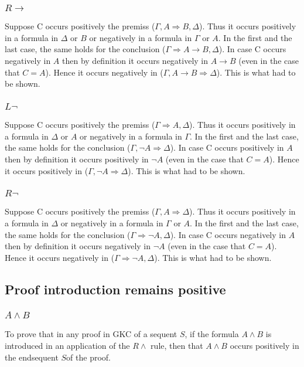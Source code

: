 \documentclass{article}
\begin{document}
\subsubsection{$R\to$}
Suppose C occurs positively the premiss
($\Gamma, A \Rightarrow B, \Delta$). Thus it occurs positively in a formula
in $\Delta$ or $B$ or negatively in a formula in $\Gamma$ or $A$.
In the first and the last case,
the same holds for the conclusion ($\Gamma \Rightarrow A \to B, \Delta$).
In case C occurs negatively in $A$ then by definition it occurs negatively
in $A \to B$ (even in the case that $C = A$). Hence it occurs negatively
in ($\Gamma, A \to B \Rightarrow \Delta$). This is what had to be shown.

\subsubsection{$L\neg$}
Suppose C occurs positively the premiss
($\Gamma \Rightarrow A, \Delta$). Thus it occurs positively in a formula
in $\Delta$ or $A$ or negatively in a formula in $\Gamma$.
In the first and the last case,
the same holds for the conclusion ($\Gamma, \neg A \Rightarrow \Delta$).
In case C occurs positively in $A$ then by definition it occurs positively
in $\neg A$ (even in the case that $C = A$). Hence it occurs positively
in ($\Gamma, \neg A \Rightarrow \Delta$). This is what had to be shown.

\subsubsection{$R\neg$}
Suppose C occurs positively the premiss
($\Gamma, A \Rightarrow \Delta$). Thus it occurs positively in a formula
in $\Delta$ or negatively in a formula in $\Gamma$ or $A$.
In the first and the last case,
the same holds for the conclusion ($\Gamma \Rightarrow \neg A, \Delta$).
In case C occurs negatively in $A$ then by definition it occurs negatively
in $\neg A$ (even in the case that $C = A$). Hence it occurs negatively
in ($\Gamma \Rightarrow \neg A, \Delta$). This is what had to be shown.

\subsection{Proof introduction remains positive}

\subsubsection{$A\wedge B$}
To prove that in any proof in GKC of a sequent $S$, if the formula
$A \wedge B$ is introduced in an application of the $R\wedge$ rule,
then that $A \wedge B$ occurs positively in the endsequent $S$of the
proof.
\end{document}
